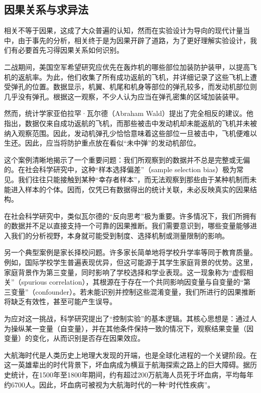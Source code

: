 \subsection{因果关系与求异法}

相关不等于因果，这成了大众普遍的认知，然而在实验设计为导向的现代计量当中，由于事先的分析，相关终于是为因果开辟了道路，为了更好理解实验设计，我们有必要首先习得因果关系如何识别。

二战期间，美国空军希望研究应优先在轰炸机的哪些部位加装防护装甲，以提高飞机的返航率。为此，他们收集了所有成功返航的飞机，并详细记录了这些飞机上遭受弹孔的位置。数据显示，机翼、机尾和机身等部位的弹孔较多，而发动机部位则几乎没有弹孔。根据这一观察，不少人认为应当在弹孔密集的区域加装装甲。

然而，统计学家亚伯拉罕·瓦尔德（Abraham Wald）提出了完全相反的建议。他指出，数据仅来自成功返航的飞机，而那些被击中发动机却未能返航的飞机并未被纳入观察范围。因此，发动机弹孔少恰恰意味着这些部位一旦被击中，飞机便难以生还。因此，应当将防护重点放在看似“未中弹”的发动机部位。

这个案例清晰地揭示了一个重要问题：我们所观察到的数据并不总是完整或无偏的。在社会科学研究中，这种“样本选择偏差”（sample selection bias）极为常见。我们往往只能接触到某种“幸存者样本”，而无法观察到那些由于某种机制而未能进入样本的个体。因而，仅凭已有数据得出的统计关联，未必反映真实的因果结构。

在社会科学研究中，类似瓦尔德的“反向思考”极为重要。许多情况下，我们所拥有的数据并不足以直接支持一个可靠的因果推断。我们需要意识到，哪些变量能够进入我们的分析视野，本身就可能受到制度、选择机制或测量限制的影响。

另一个典型案例是家长择校问题。许多家长简单地将学校升学率等同于教育质量。例如，国际学校学生普遍表现优异，但这可能源于其学生家庭背景的优势。这里，家庭背景作为第三变量，同时影响了学校选择和学业表现。这一现象称为“虚假相关”（spurious correlation），其根源在于存在一个共同影响因变量与自变量的“第三变量”（confounder）。若未能识别并控制这些混淆变量，我们所进行的因果推断将缺乏有效性，甚至可能产生误导。

为应对这一挑战，科学研究提出了“控制实验”的基本逻辑。其核心思想是：通过人为操纵某一变量（自变量），并在其他条件保持一致的情况下，观察结果变量（因变量）的变化，从而识别是否存在因果效应。

大航海时代是人类历史上地理大发现的开端，也是全球化进程的一个关键阶段。在这一英雄辈出的时代背景下，坏血病成为横亘于航海探索之路上的巨大障碍。据历史统计，在1500年至1800年期间，约有超过200万航海人员死于坏血病，平均每年约6700人。因此，坏血病可被视为大航海时代的一种“时代性疾病”。

